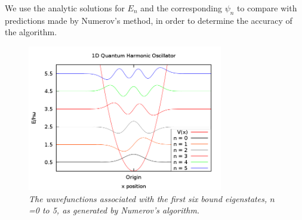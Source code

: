 \documentclass[aps,prl,twocolumn,superscriptaddress]{revtex4-1}
\begin{document}
We use the analytic solutions for $E_n$ and the corresponding $\psi_n$ to compare with predictions made by Numerov's 
method, in order to determine the accuracy of the algorithm. 

\begin{figure}[h!]
 \centering
 \includegraphics[width=3.35in]{harmOsc.png}
 \caption{\it \small{The wavefunctions associated with the first six bound eigenstates, $n$=0 to 5, as generated by Numerov's algorithm.}}
 \label{fig:harmOsc}
\end{figure}
\end{document}
